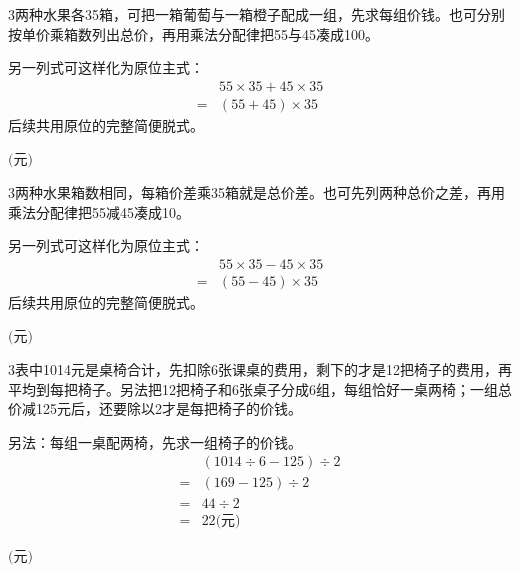\documentclass[multi=snippet,border={5bp 20bp 5bp 5bp}]{standalone}
\newenvironment{snippet}[3]{\begin{minipage}{#1bp}\color{answerred}\fontsize{#2}{#3}\selectfont\raggedright}{\end{minipage}}
\begin{document}
\begin{snippet}{505}{11.5}{14}\begin{multicols}{3}\raggedcolumns 两种水果各35箱，可把一箱葡萄与一箱橙子配成一组，先求每组价钱。也可分别按单价乘箱数列出总价，再用乘法分配律把55与45凑成100。\par 另一列式可这样化为原位主式：\[\begin{aligned}&55\times35+45\times35\\={}&(55+45)\times35\end{aligned}\]后续共用原位的完整简便脱式。\end{multicols}\end{snippet}
\begin{snippet}{80}{9.0}{14}\SourceSans\setlength{\mathindent}{2bp}\(\text{(元)}\)\end{snippet}
\begin{snippet}{505}{11.5}{14}\begin{multicols}{3}\raggedcolumns 两种水果箱数相同，每箱价差乘35箱就是总价差。也可先列两种总价之差，再用乘法分配律把55减45凑成10。\par 另一列式可这样化为原位主式：\[\begin{aligned}&55\times35-45\times35\\={}&(55-45)\times35\end{aligned}\]后续共用原位的完整简便脱式。\end{multicols}\end{snippet}
\begin{snippet}{80}{9.0}{14}\SourceSans\setlength{\mathindent}{2bp}\(\text{(元)}\)\end{snippet}
\begin{snippet}{505}{11.5}{14}\begin{multicols}{3}\raggedcolumns 表中1014元是桌椅合计，先扣除6张课桌的费用，剩下的才是12把椅子的费用，再平均到每把椅子。另法把12把椅子和6张桌子分成6组，每组恰好一桌两椅；一组总价减125元后，还要除以2才是每把椅子的价钱。\par 另法：每组一桌配两椅，先求一组椅子的价钱。\[\begin{aligned}&(1014\div6-125)\div2\\={}&(169-125)\div2\\={}&44\div2\\={}&22\text{(元)}\end{aligned}\]\end{multicols}\end{snippet}
\begin{snippet}{80}{9.0}{14}\SourceSans\setlength{\mathindent}{2bp}\(\text{(元)}\)\end{snippet}
\end{document}
